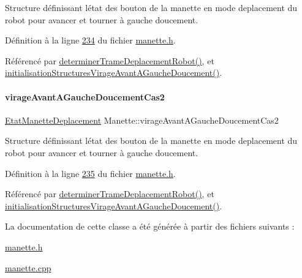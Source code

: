 Structure définissant l\textquotesingle{}état des bouton de la manette en mode deplacement du robot pour avancer et tourner à gauche doucement. 



Définition à la ligne \hyperlink{manette_8h_source_l00234}{234} du fichier \hyperlink{manette_8h_source}{manette.\+h}.



Référencé par \hyperlink{manette_8cpp_source_l00341}{determiner\+Trame\+Deplacement\+Robot()}, et \hyperlink{manette_8cpp_source_l00215}{initialisation\+Structures\+Virage\+Avant\+A\+Gauche\+Doucement()}.

\mbox{\label{class_manette_a575018c439de0fd1e8cf7be5907ca60d}} 
\paragraph{\texorpdfstring{virage\+Avant\+A\+Gauche\+Doucement\+Cas2}{virageAvantAGaucheDoucementCas2}}
{\footnotesize\ttfamily \hyperlink{struct_etat_manette_deplacement}{Etat\+Manette\+Deplacement} Manette\+::virage\+Avant\+A\+Gauche\+Doucement\+Cas2\hspace{0.3cm}{\ttfamily [private]}}



Structure définissant l\textquotesingle{}état des bouton de la manette en mode deplacement du robot pour avancer et tourner à gauche doucement. 



Définition à la ligne \hyperlink{manette_8h_source_l00235}{235} du fichier \hyperlink{manette_8h_source}{manette.\+h}.



Référencé par \hyperlink{manette_8cpp_source_l00341}{determiner\+Trame\+Deplacement\+Robot()}, et \hyperlink{manette_8cpp_source_l00215}{initialisation\+Structures\+Virage\+Avant\+A\+Gauche\+Doucement()}.



La documentation de cette classe a été générée à partir des fichiers suivants \+:\begin{DoxyCompactItemize}
\item 
\hyperlink{manette_8h}{manette.\+h}\item 
\hyperlink{manette_8cpp}{manette.\+cpp}\end{DoxyCompactItemize}
